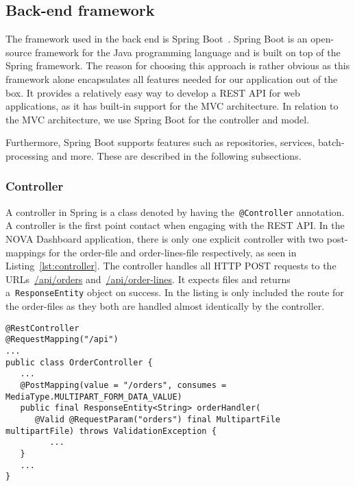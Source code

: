 \subsection{Back-end framework}\label{subsec:back-end-framework}

The framework used in the back end is Spring Boot~\cite{springboot2024}.
Spring Boot is an open-source framework for the Java programming language and is built on top of the Spring framework.
The reason for choosing this approach is rather obvious as this framework alone encapsulates all features needed for our
application out of the box.
It provides a relatively easy way to develop a REST API for web applications, as it has built-in support for the MVC
architecture.
In relation to the MVC architecture, we use Spring Boot for the controller and model.

Furthermore, Spring Boot supports features such as repositories, services, batch-processing and more.
These are described in the following subsections.

\subsubsection{Controller}
A controller in Spring is a class denoted by having the~\texttt{@Controller} annotation.
A controller is the first point contact when engaging with the REST API\@.
In the NOVA Dashboard application, there is only one explicit controller with two post-mappings for the order-file and
order-lines-file respectively, as seen in Listing~\ref{lst:controller}.
The controller handles all HTTP POST requests to the URLs~\url{/api/orders} and~\url{/api/order-lines}.
It expects files and returns a~\texttt{ResponseEntity} object on success.
In the listing is only included the route for the order-files as they both are handled almost identically by the
controller.

\begin{lstlisting}[style=java, caption=A selection of code from the main controller in the application.
Dots (...) represent skipped code.,label={lst:controller}]
@RestController
@RequestMapping("/api")
...
public class OrderController {
   ...
   @PostMapping(value = "/orders", consumes = MediaType.MULTIPART_FORM_DATA_VALUE)
   public final ResponseEntity<String> orderHandler(
      @Valid @RequestParam("orders") final MultipartFile multipartFile) throws ValidationException {
         ...
   }
   ...
}
\end{lstlisting}

